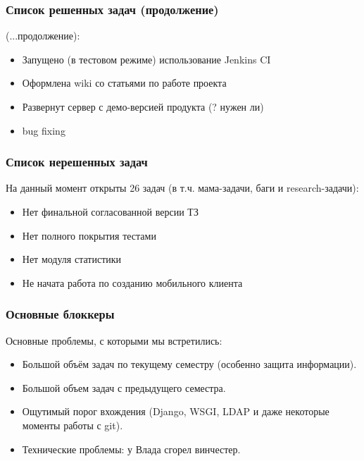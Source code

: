 \documentclass{beamer}
\newlength{\wideitemsep}
\let\olditem\item
\renewcommand{\item}{\setlength{\itemsep}{\wideitemsep}\olditem}
\begin{document}
\begin{frame}
\frametitle{Список решенных задач (продолжение)}

(...продолжение):
\begin{itemize}
\item Запущено (в тестовом режиме) использование Jenkins CI
\item Оформлена wiki со статьями по работе проекта
\item Развернут сервер с демо-версией продукта (? нужен ли)
\item bug fixing
\end{itemize}


\end{frame}


\begin{frame}
\frametitle{Список нерешенных задач}

На данный момент открыты 26 задач (в т.ч. мама-задачи, баги и research-задачи):
\begin{itemize}
\item Нет финальной согласованной версии ТЗ
\item Нет полного покрытия тестами
\item Нет модуля статистики
\item Не начата работа по созданию мобильного клиента
\end{itemize}


\end{frame}


\begin{frame}
\frametitle{Основные блоккеры}

Основные проблемы, с которыми мы встретились:
\begin{itemize}
\item Большой объём задач по текущему семестру (особенно защита информации).
\item Большой объем задач с предыдущего семестра.
\item Ощутимый порог вхождения (Django, WSGI, LDAP и даже некоторые моменты работы с git).
\item Технические проблемы: у Влада сгорел винчестер.
\end{itemize}


\end{frame}

\end{document}
